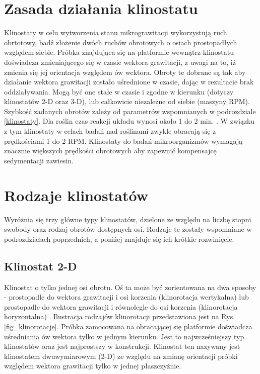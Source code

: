 \section{Zasada działania klinostatu}

Klinostaty w celu wytworzenia stanu mikrograwitacji wykorzystują ruch obrtotowy, badź
 złożenie dwóch ruchów obrotowych o osiach prostopadłych względem siebie. Próbka
  znajdująca się na platformie wewnątrz klinostatu doświadcza zmieniającego się w czasie
   wektora grawitacji, z uwagi na to, iż zmienia się jej orientacja względem ów wektora.
    Obroty te dobrane są tak aby działanie wektora grawitacji zostało uśrednione w
     czasie, dając w rezultacie brak oddziaływania. Mogą być one stałe w czasie i zgodne
      w kierunku (dotyczy klinostatów 2-D oraz 3-D), lub całkowicie niezależne od siebie
       (maszyny RPM). Szybkość zadanych obrotów zależy od parametrów wspomnianych w
        podrozdziale \ref{klinostaty}. Dla roślin czas reakcji układu wynosi około 1 do
         2 min. \cite{bib:klinostat_lafayette}. W związku z tym klinostaty w celach badań
          nad roślinami zwykle obracają się z prędkościami 1 do 2 RPM. Klinostaty do
           badań mikroorganizmów wymagają znacznie większych prędkości obrotowych aby
            zapewnić kompensajcę sedymentacji zawiesin.
            

\section{Rodzaje klinostatów}

Wyróżnia się trzy główne typy klinostatów, dzielone ze względu na liczbę stopni swobody
 oraz rodzaj obrotów dostępnych osi. Rodzaje te zostały wspomniane w podrozdziałach
  poprzednich, a poniżej znajduje się ich krótkie rozwinięcie.

\subsection{Klinostat 2-D}

Klinostat o tylko jednej osi obrotu. Oś ta może być zorientowana na dwa sposoby -
 prostopadle do wektora grawitacji i osi korzenia (klinorotacja wertykalna) lub
  prostopadle do wektora grawitacji i równolegle do osi korzenia (klinorotacja
   horyzontalna) \cite{bib:klinorotacja} . Ilustracja rodzajów klinorotacji
    przedstawiona jest na Rys. \ref{fig_klinorotacje}. Próbka zamocowana na
     obracającej się platformie doświadcza uśredniania ów wektora tylko w jednym
      kierunku. Jest to najwcześniejszy typ klinostatów oraz jest najprostszy w
       konstrukcji. Klinostat ten nazywany jest klinostatem dwuwymiarowym (2-D) ze
        względu na zmianę orientacji próbki względem wektora grawitacji tylko w jednej
         płaszczyźnie.

